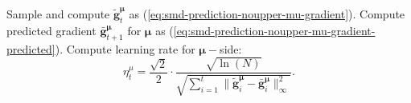 \documentclass[12pt]{article}
\begin{document}
\begin{algorithm}[htb]
\begin{algorithmic}[1]
       \State Sample and compute $\tilde{\boldsymbol{g}}^{\boldsymbol{\mu}}_t$ as (\ref{eq:smd-prediction-noupper-mu-gradient}).
       \State Compute predicted gradient \textcolor{black}{$\bar{\boldsymbol{g}}^{\boldsymbol{\mu}}_{t+1}$} for $\boldsymbol{\mu}$ as (\ref{eq:smd-prediction-noupper-mu-gradient-predicted}).
       \State Compute learning rate for $\boldsymbol{\mu}-$side:
       \begin{equation}
           \eta_t^{\mu} = \frac{\sqrt{2}}{2} \cdot \frac{\sqrt{\ln(N)}}{\sqrt{\sum_{i=1}^t \|\tilde{\boldsymbol{g}}^{\boldsymbol{\mu}}_i - \bar{\boldsymbol{g}}^{\boldsymbol{\mu}}_i\|_{\infty}^2}}.
           \label{eq:smd-prediction-noupper-mu-learning-rate}

\end{equation}
\end{algorithmic}
\end{algorithm}
\end{document}
